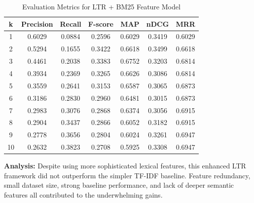\begin{table}[H]
\centering
\begin{tabular}{|c|c|c|c|c|c|c|}
\hline
k & Precision & Recall & F-score & MAP & nDCG & MRR \\
\hline
1 & 0.6029 & 0.0884 & 0.2596 & 0.6029 & 0.3419 & 0.6029 \\
2 & 0.5294 & 0.1655 & 0.3422 & 0.6618 & 0.3499 & 0.6618 \\
3 & 0.4461 & 0.2038 & 0.3383 & 0.6752 & 0.3203 & 0.6814 \\
4 & 0.3934 & 0.2369 & 0.3265 & 0.6626 & 0.3086 & 0.6814 \\
5 & 0.3559 & 0.2641 & 0.3153 & 0.6587 & 0.3065 & 0.6873 \\
6 & 0.3186 & 0.2830 & 0.2960 & 0.6481 & 0.3015 & 0.6873 \\
7 & 0.2983 & 0.3076 & 0.2868 & 0.6374 & 0.3056 & 0.6915 \\
8 & 0.2904 & 0.3437 & 0.2866 & 0.6052 & 0.3182 & 0.6915 \\
9 & 0.2778 & 0.3656 & 0.2804 & 0.6024 & 0.3261 & 0.6947 \\
10 & 0.2632 & 0.3823 & 0.2708 & 0.5925 & 0.3308 & 0.6947 \\
\hline
\end{tabular}
\caption{Evaluation Metrics for LTR + BM25 Feature Model}
\end{table}

\textbf{Analysis:}
Despite using more sophisticated lexical features, this enhanced LTR framework did not outperform the simpler TF-IDF baseline. Feature redundancy, small dataset size, strong baseline performance, and lack of deeper semantic features all contributed to the underwhelming gains.
